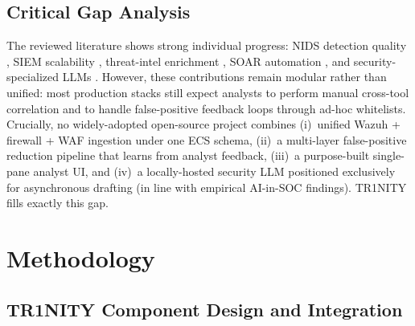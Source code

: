 \documentclass[11pt,a4paper]{article}
\begin{document}
\subsection{Critical Gap Analysis}

The reviewed literature shows strong individual progress: NIDS detection quality \cite{almansoori2024nids, martinez2021dl}, SIEM scalability \cite{nasr2022siem}, threat-intel enrichment \cite{wagner2022ti}, SOAR automation \cite{collier2023soar}, and security-specialized LLMs \cite{cisco2025foundationsec}. However, these contributions remain modular rather than unified: most production stacks still expect analysts to perform manual cross-tool correlation and to handle false-positive feedback loops through ad-hoc whitelists. Crucially, no widely-adopted open-source project combines (i)~unified Wazuh + firewall + WAF ingestion under one ECS schema, (ii)~a multi-layer false-positive reduction pipeline that learns from analyst feedback, (iii)~a purpose-built single-pane analyst UI, and (iv)~a locally-hosted security LLM positioned exclusively for asynchronous drafting (in line with empirical AI-in-SOC findings). TR1NITY fills exactly this gap.

\newpage
\section{Methodology}
\label{sec:methodology}

\subsection{TR1NITY Component Design and Integration}
\end{document}
